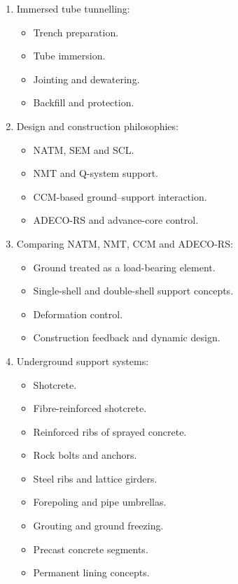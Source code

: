 \documentclass[12pt,oneside]{book}
\begin{document}
\begin{enumerate}
\begin{itemize}
    \end{itemize}
    \item Immersed tube tunnelling:
    \begin{itemize}
        \item Trench preparation.
        \item Tube immersion.
        \item Jointing and dewatering.
        \item Backfill and protection.
    \end{itemize}
    \item Design and construction philosophies:
    \begin{itemize}
        \item NATM, SEM and SCL.
        \item NMT and Q-system support.
        \item CCM-based ground--support interaction.
        \item ADECO-RS and advance-core control.
    \end{itemize}
    \item Comparing NATM, NMT, CCM and ADECO-RS:
    \begin{itemize}
        \item Ground treated as a load-bearing element.
        \item Single-shell and double-shell support concepts.
        \item Deformation control.
        \item Construction feedback and dynamic design.
    \end{itemize}
    \item Underground support systems:
    \begin{itemize}
        \item Shotcrete.
        \item Fibre-reinforced shotcrete.
        \item Reinforced ribs of sprayed concrete.
        \item Rock bolts and anchors.
        \item Steel ribs and lattice girders.
        \item Forepoling and pipe umbrellas.
        \item Grouting and ground freezing.
        \item Precast concrete segments.
        \item Permanent lining concepts.
    \end{itemize}

\end{enumerate}
\end{document}
